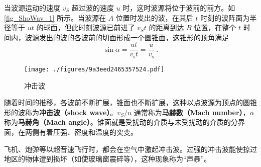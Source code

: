 
当波源运动的速度 $v_S$ 超过波的速度 $u $ 时，这时波源将位于波前的前方。如\autoref{fig_ShoWav_1} 所示。当波源在 $A $ 位置时发出的波，在其后 $t $ 时刻的波阵面为半径等于 $ut $ 的球面，但此时刻波源已前进了 $v_St$ 的距离到达 $B $ 位置，在整个 $t $ 时间内，波源发出的波的各波前的切面形成一个圆锥面，这锥形的顶角满足
\begin{equation}
\sin \alpha=\frac{u t}{v_{\mathrm{s}} t}=\frac{u}{v_{\mathrm{s}}}~.
\end{equation}
\begin{figure}[ht]
\centering
\texttt{[image: ./figures/9a3eed2465357524.pdf]}
\caption{冲击波} \label{fig_ShoWav_1}
\end{figure}
随着时间的推移，各波前不断扩展，锥面也不断扩展，这种以点波源为顶点的圆锥形的波称为\textbf{冲击波（shock wave）}。$v_S/u$ 通常称为\textbf{马赫数（Mach number）}，$\alpha$ 称为\textbf{马赫角（Mach angle）}。锥面就是受扰动的介质与未受扰动的介质的分界面，在两侧有着压强、密度和温度的突变。

飞机、炮弹等以超音速飞行时，都会在空气中激起冲击波。过强的冲击波能使掠过地区的物体遭到损坏（如使玻璃窗震碎等），这种现象称为“声暴”。
